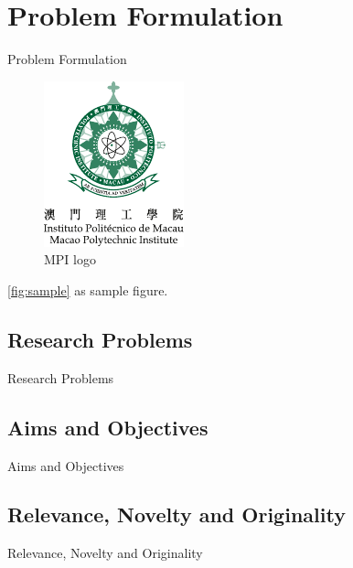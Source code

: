\chapter{Problem Formulation}

Problem Formulation

\begin{figure} [h]
	\centering
	\includegraphics[width=0.5\linewidth]{MPI.pdf}
	\caption{MPI logo}
	\label{fig:sample}
\end{figure}

\autoref{fig:sample} as sample figure.

\section{Research Problems}

Research Problems

\section{Aims and Objectives}

Aims and Objectives

\section{Relevance, Novelty and Originality}

Relevance, Novelty and Originality